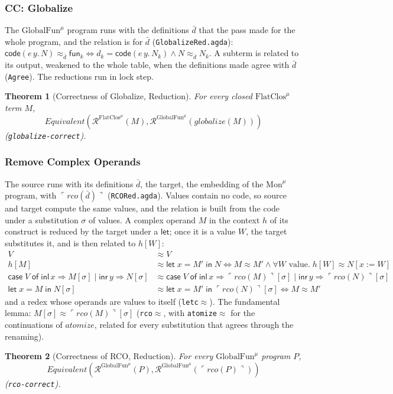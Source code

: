 \documentclass[10pt]{article}
\theoremstyle{acmplain}
\newtheorem{theorem}{Theorem}[section]
\newcommand{\key}[1]{\mathsf{#1}}
\newcommand{\pass}[1]{\mathit{#1}}
\newcommand{\Let}{\key{let}\;}
\newcommand{\In}{\;\key{in}\;}
\newcommand{\Case}[5]{\key{case}\;#1\;\key{of}\;\key{inl}\,#2 \Rightarrow #3 \mid \key{inr}\,#4 \Rightarrow #5}
\newcommand{\funref}[1]{\key{fun}_{#1}}
\newcommand{\Equiv}{\mathit{Equivalent}}
\newcommand{\Tcodetm}[3]{\key{code}(#1\,#2.\,#3)}  %
\newcommand{\Tembed}[1]{\ulcorner #1 \urcorner}  %
\newcommand{\Ml}[1]{\textrm{#1}^{\mu}}                  %
\begin{document}
\subsubsection{CC: Globalize}

The $\Ml{GlobalFun}$ program runs with the definitions $\bar{d}$ that the pass
made for the whole program, and the relation is for $\bar{d}$
(\texttt{GlobalizeRed.agda}):
$\Tcodetm{e}{y}{N} \approx_{\bar{d}} \funref{k} \iff
d_k = \Tcodetm{e}{y}{N_k} \land N \approx_{\bar{d}} N_k$. A subterm is related
to its output, weakened to the whole table, when the definitions made
agree with $\bar{d}$ (\texttt{Agree}). The reductions run in lock step.
\begin{theorem}[Correctness of Globalize, Reduction]\label{thm:m-red-globalize}
For every closed $\Ml{FlatClos}$ term $M$,
\[ \Equiv(\mathcal{R}^{\Ml{FlatClos}}(M), \mathcal{R}^{\Ml{GlobalFun}}(\pass{globalize}(M))) \]
(\texttt{globalize-correct}).
\end{theorem}

\subsubsection{Remove Complex Operands}

The source runs with its definitions $\bar{d}$, the target, the embedding
of the $\Ml{Mon}$ program, with $\Tembed{\pass{rco}(\bar{d})}$
(\texttt{RCORed.agda}). Values contain no code, so source and target
compute the same values, and the relation is built from the code under a
substitution $\sigma$ of values. A complex operand $M$ in the context $h$ of
its construct is reduced by the target under a $\key{let}$; once it is a
value $W$, the target substitutes it, and is then related to $h[W]$:
\begin{align*}
  V &\approx V \\
  h[M] &\approx \Let x = M' \In N
    \iff M \approx M' \land \forall W \text{ value}.\; h[W] \approx N[x := W] \\
  \Case{V}{x}{M[\sigma]}{y}{N[\sigma]} &\approx
    \Case{V}{x}{\Tembed{\pass{rco}(M)}[\sigma]}{y}{\Tembed{\pass{rco}(N)}[\sigma]} \\
  \Let x = M \In N[\sigma] &\approx \Let x = M' \In \Tembed{\pass{rco}(N)}[\sigma]
    \iff M \approx M'
\end{align*}
and a redex whose operands are values to itself (\texttt{letc$\approx$}). The
fundamental lemma: $M[\sigma] \approx \Tembed{\pass{rco}(M)}[\sigma]$
(\texttt{rco$\approx$}, with \texttt{atomize$\approx$} for the continuations of
$\pass{atomize}$, related for every substitution that agrees through the
renaming).
\begin{theorem}[Correctness of RCO, Reduction]\label{thm:m-red-rco}
For every $\Ml{GlobalFun}$ program $P$,
\[ \Equiv(\mathcal{R}^{\Ml{GlobalFun}}(P), \mathcal{R}^{\Ml{GlobalFun}}(\Tembed{\pass{rco}(P)})) \]
(\texttt{rco-correct}).
\end{theorem}
\end{document}
